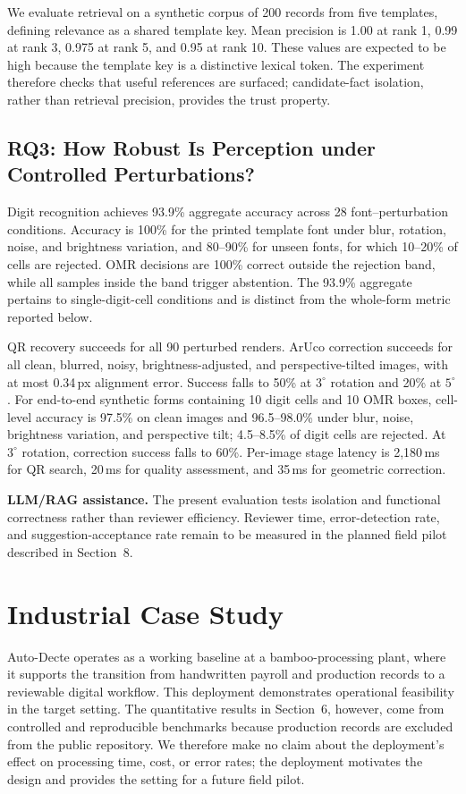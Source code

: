 \documentclass[runningheads]{llncs}
\begin{document}
We evaluate retrieval on a synthetic corpus of 200 records from five templates, defining relevance as a shared template key. Mean precision is 1.00 at rank 1, 0.99 at rank 3, 0.975 at rank 5, and 0.95 at rank 10. These values are expected to be high because the template key is a distinctive lexical token. The experiment therefore checks that useful references are surfaced; candidate-fact isolation, rather than retrieval precision, provides the trust property.

\subsection{RQ3: How Robust Is Perception under Controlled Perturbations?}
Digit recognition achieves 93.9\% aggregate accuracy across 28 font--perturbation conditions. Accuracy is 100\% for the printed template font under blur, rotation, noise, and brightness variation, and 80--90\% for unseen fonts, for which 10--20\% of cells are rejected. OMR decisions are 100\% correct outside the rejection band, while all samples inside the band trigger abstention. The 93.9\% aggregate pertains to single-digit-cell conditions and is distinct from the whole-form metric reported below.

QR recovery succeeds for all 90 perturbed renders. ArUco correction succeeds for all clean, blurred, noisy, brightness-adjusted, and perspective-tilted images, with at most 0.34\,px alignment error. Success falls to 50\% at $3^\circ$ rotation and 20\% at $5^\circ$. For end-to-end synthetic forms containing 10 digit cells and 10 OMR boxes, cell-level accuracy is 97.5\% on clean images and 96.5--98.0\% under blur, noise, brightness variation, and perspective tilt; 4.5--8.5\% of digit cells are rejected. At $3^\circ$ rotation, correction success falls to 60\%. Per-image stage latency is 2{,}180\,ms for QR search, 20\,ms for quality assessment, and 35\,ms for geometric correction.

\textbf{LLM/RAG assistance.} The present evaluation tests isolation and functional correctness rather than reviewer efficiency. Reviewer time, error-detection rate, and suggestion-acceptance rate remain to be measured in the planned field pilot described in Section~8.

\section{Industrial Case Study}
Auto-Decte operates as a working baseline at a bamboo-processing plant, where it supports the transition from handwritten payroll and production records to a reviewable digital workflow. This deployment demonstrates operational feasibility in the target setting. The quantitative results in Section~6, however, come from controlled and reproducible benchmarks because production records are excluded from the public repository. We therefore make no claim about the deployment's effect on processing time, cost, or error rates; the deployment motivates the design and provides the setting for a future field pilot.
\end{document}
